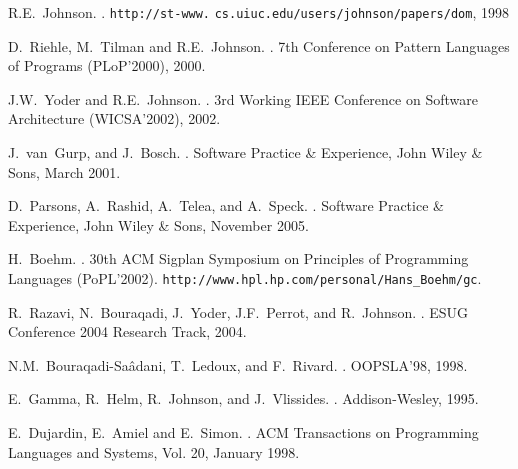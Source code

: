 \documentclass[preprint,10pt]{sigplanconf}
\begin{document}
\begin{PERL}[left]
{\begin{thebibliography}{10}
R.E.~Johnson.
.
\newblock \verb!http://st-www.! \verb!cs.uiuc.edu/users/johnson/papers/dom!, 1998

D.~Riehle, M.~Tilman and R.E.~Johnson.
.
\newblock 7th Conference on Pattern Languages of Programs (PLoP'2000), 2000.

J.W.~Yoder and R.E.~Johnson.
.
\newblock 3rd Working IEEE Conference on Software Architecture (WICSA'2002), 2002.

J.~van~Gurp, and J.~Bosch.
.
\newblock Software Practice \& Experience, John Wiley \& Sons, March 2001.

D.~Parsons, A.~Rashid, A.~Telea, and A.~Speck.
.
\newblock Software Practice \& Experience, John Wiley \& Sons, November 2005.

H.~Boehm.
.
\newblock 30th ACM Sigplan Symposium on Principles of Programming Languages (PoPL'2002).
\newblock \verb!http://www.hpl.hp.com/personal/Hans_Boehm/gc!.


R.~Razavi, N.~Bouraqadi, J.~Yoder, J.F.~Perrot, and R.~Johnson.
.
\newblock ESUG Conference 2004 Research Track, 2004.

N.M.~Bouraqadi-Sa\^adani, T.~Ledoux, and F.~Rivard.
.
\newblock OOPSLA'98, 1998.

E.~Gamma, R.~Helm, R.~Johnson, and J.~Vlissides.
.
\newblock Addison-Wesley, 1995.





















E.~Dujardin, E.~Amiel and E.~Simon.
.
\newblock ACM Transactions on Programming Languages and Systems, Vol. 20, January 1998.


\end{thebibliography}}
\end{PERL}
\end{document}
